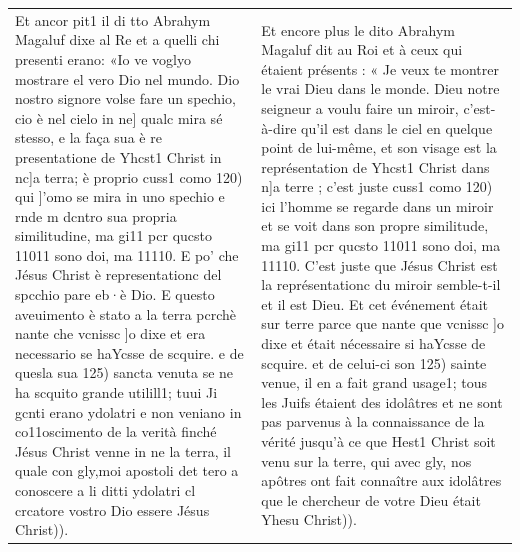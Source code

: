 \begin{longtable}{p{}p{}}
Et ancor pit1 il di tto Abrahym Magaluf dixe al Re et a quelli chi presenti erano: «Io ve voglyo mostrare el vero Dio nel mundo. Dio nostro signore volse fare un spechio, cio è nel cielo in ne] qualc mira sé stesso, e la faça sua è re  presentatione de Yhcst1 Christ in  nc]a terra; è proprio cuss1 como
120) qui ]'omo se mira in uno spechio e rnde m dcntro sua propria
similitudine, ma gi11 pcr qucsto 11011 sono doi, ma 11110. E po' che  Jésus  Christ è representationc del spcchio pare eb·è Dio. E questo aveuimento è stato a la terra pcrchè  nante che vcnissc
]o dixe et era necessario se haYcsse de scquire. e de quesla sua
125) sancta venuta se ne ha scquito grande utilill1; tuui Ji gcnti erano ydolatri e non veniano in co11oscimento de la verità finché Jésus Christ venne in ne la terra, il quale con gly,moi apostoli det  tero a conoscere a li ditti ydolatri cl crcatore vostro Dio essere Jésus Christ)).
&
Et encore plus le dito Abrahym Magaluf dit au Roi et à ceux qui étaient présents : « Je veux te montrer le vrai Dieu dans le monde. Dieu notre seigneur a voulu faire un miroir, c'est-à-dire qu'il est dans le ciel en quelque point de lui-même, et son visage est la représentation de Yhcst1 Christ dans n]a terre ; c'est juste cuss1 como
120) ici l'homme se regarde dans un miroir et se voit dans son propre
similitude, ma gi11 pcr qucsto 11011 sono doi, ma 11110. C'est juste que Jésus Christ est la représentationc du miroir semble-t-il et il est Dieu. Et cet événement était sur terre parce que nante que vcnissc
]o dixe et était nécessaire si haYcsse de scquire. et de celui-ci son
125) sainte venue, il en a fait grand usage1; tous les Juifs étaient des idolâtres et ne sont pas parvenus à la connaissance de la vérité jusqu'à ce que Hest1 Christ soit venu sur la terre, qui avec gly, nos apôtres ont fait connaître aux idolâtres que le chercheur de votre Dieu était Yhesu Christ)). \\
    \end{longtable}
 